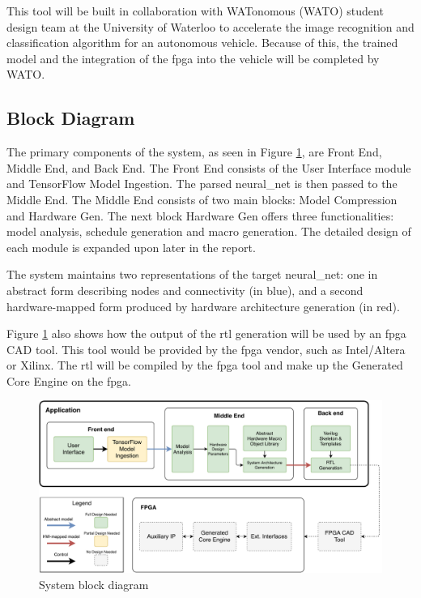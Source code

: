 \documentclass{uw-ece-wkrpt}
\begin{document}
This tool will be built in collaboration with WATonomous (WATO) student design team at the University of Waterloo to accelerate the image recognition and classification algorithm for an autonomous vehicle. Because of this, the trained model and the integration of the \gls{fpga} into the vehicle will be completed by WATO.

\subsection{Block Diagram}

The primary components of the system, as seen in Figure \ref{fig:system_block_diagram}, are Front End, Middle End, and Back End. The Front End consists of the User Interface module and TensorFlow Model Ingestion. The parsed \gls{neural_net} is then passed to the Middle End. The Middle End consists of two main blocks: Model Compression and Hardware Gen. The next block Hardware Gen offers three functionalities: model analysis, schedule generation and macro generation.  The detailed design of each module is expanded upon later in the report.

The system maintains two representations of the target \gls{neural_net}: one in abstract form describing nodes and connectivity (in blue), and a second hardware-mapped form produced by hardware architecture generation (in red).

Figure \ref{fig:system_block_diagram} also shows how the output of the \gls{rtl} generation will be used by an \gls{fpga} CAD tool. This tool would be provided by the \gls{fpga} vendor, such as Intel/Altera or Xilinx. The \gls{rtl} will be compiled by the \gls{fpga} tool and make up the Generated Core Engine on the \gls{fpga}.

\begin{figure}
    \centering
    \includegraphics[width=\textwidth]{figures/system_block_diagram}
    \caption{System block diagram}\label{fig:system_block_diagram}
\end{figure}
\end{document}
